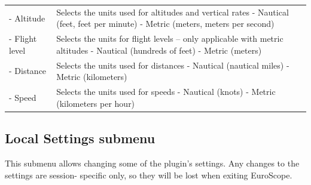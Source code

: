 \documentclass[11pt,a4paper,oldfontcommands]{memoir}
\begin{document}
\begin{tabular}{p{5cm}p{10cm}}
    \\- Altitude & Selects the units used for altitudes and vertical rates
    - Nautical (feet, feet per minute)
    - Metric (meters, meters per second)
    \\- Flight level & Selects the units for flight levels – only applicable with metric altitudes
    - Nautical (hundreds of feet)
    - Metric (meters)
    \\- Distance & Selects the units used for distances
    - Nautical (nautical miles)
    - Metric (kilometers)
    \\- Speed & Selects the units used for speeds
    - Nautical (knots)
    - Metric (kilometers per hour)
\end{tabular}

\subsection*{Local Settings submenu}
This submenu allows changing some of the plugin’s settings. Any changes to the settings are session-
specific only, so they will be lost when exiting EuroScope.
\end{document}
